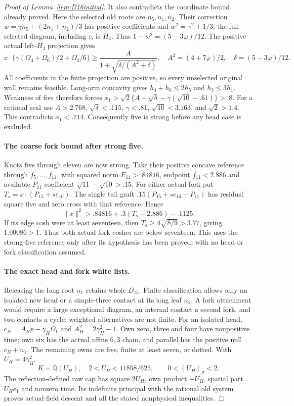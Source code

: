 \documentclass[11pt]{article}
\begin{document}
\begin{proof}[Proof of Lemma~\ref{lem:D16initial}]
It also contradicts the coordinate bound already proved.
Here the selected old roots are $n_5,n_1,n_2$. Their correction
$w=\gamma n_5+(2n_1+n_2)/3$ has positive coefficients and
$w^2=\gamma^2+1/3$; the full selected diagram, including $c$,
is $H_4$. Thus $1-w^2=(5-3\varphi)/12$.
The positive actual left-$H_4$ projection gives
\[
 x\cdot\{\gamma(\Omega_4+\Omega_6)/2+\Omega_3/6\}
 \ge \frac{A}{1+\sqrt{\delta/(A^2+\delta)}},
\quad
 A^2=(4+7\varphi)/2,\quad \delta=(5-3\varphi)/12.
\]
All coefficients in the finite projection are positive, so every
unselected original wall remains feasible. Long-arm concavity gives
$h_4+h_6\le2h_5$ and $h_3\le3h_1$.
Weakness of five therefore forces
$x_1>\sqrt2\{A-\sqrt\delta-\gamma(\sqrt{10}-.61)\}>.8$.
For a rational seal use $A>2.768$, $\sqrt\delta<.115$,
$\gamma<.81$, $\sqrt{10}<3.163$, and $\sqrt2>1.4$.
This contradicts $x_1<.714$. Consequently five is strong
before any head case is excluded.

\paragraph{The coarse fork bound after strong five.}
Knots five through eleven are now strong. Take their positive concave
reference through $f_5,\ldots,f_{11}$, with squared norm
$E_{11}>.84816$, endpoint $f_{11}<2.886$ and available $P_{11}$
coefficient $\sqrt{11}-\sqrt{10}>.15$.
For either actual fork put $T_s=x\cdot(P_{15}+s e_{16})$.
The single tail graft $.15(P_{15}+s e_{16}-P_{11})$ has residual
square five and zero cross with that reference. Hence
\[
 \|x\|^2>.84816+.3(T_s-2.886)-.1125.
\]
If its edge cosh were at least seventeen, then
$T_s\ge4\sqrt{8/9}>3.77$, giving $1.00086>1$.
Thus both actual fork coshes are below seventeen.
This uses the strong-five reference only after its hypothesis has
been proved, with no head or fork classification assumed.

\paragraph{The exact head and fork white lists.}
Releasing the long root $n_1$ retains whole $D_{15}$. Finite
classification allows only an isolated new head or a simple-three
contact at its long leaf $n_2$. A fork attachment would require
a large exceptional diagram, an internal contact a second fork,
and two contacts a cycle; weighted alternatives are not finite.
For an isolated head,
$c_H=A_Hp-\gamma_H\Omega_1$ and $A_H^2=2\gamma_H^2-1$.
Own zero, three and four have nonpositive time; own six has the
actual affine $6,3$ chain, and parallel has the positive null
$c_H+n_1$. The remaining owns are five, finite at least seven,
or dotted. With $U_H=4\gamma_H^2$,
\[
 K=\mathbb Q(U_H),\quad 2<U_H<11858/625,\qquad
 0<(U_H)_\sigma<2.
\]
The reflection-defined raw cap has square $2U_H$, own product
$-U_H$, spatial part $U_He_1$ and nonzero time. Its indefinite
principal with the rational old system proves actual-field descent
and all the stated nonphysical inequalities.


\end{proof}
\end{document}
